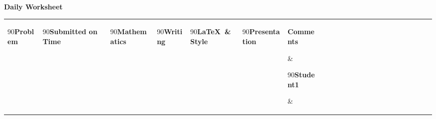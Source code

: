 \documentclass[landscape]{article}
\begin{document}
\thispagestyle{empty}

\begin{center}
    \Large\textbf{Daily Worksheet}
\end{center}

\vspace{0.5cm}

\setlength{\tabcolsep}{4pt}
\renewcommand{\arraystretch}{1.5}

\noindent
\begin{tabular}{|
>{\centering\arraybackslash}m{1.5 cm}|
>{\centering\arraybackslash}m{0.35cm}|
>{\centering\arraybackslash}m{0.35cm}|
>{\centering\arraybackslash}m{0.35cm}|
>{\centering\arraybackslash}m{0.35cm}|
>{\centering\arraybackslash}m{0.35cm}|
>{\arraybackslash}m{9.5cm}|
>{\centering\arraybackslash}m{0.35cm}|%
>{\centering\arraybackslash}m{0.35cm}|%
>{\centering\arraybackslash}m{0.35cm}|%
>{\centering\arraybackslash}m{0.35cm}|%
>{\centering\arraybackslash}m{0.35cm}|%
>{\centering\arraybackslash}m{0.35cm}|%
>{\centering\arraybackslash}m{0.35cm}|%
>{\centering\arraybackslash}m{0.35cm}|%
>{\centering\arraybackslash}m{0.35cm}|%
>{\centering\arraybackslash}m{0.35cm}|%
>{\centering\arraybackslash}m{0.35cm}|%
>{\centering\arraybackslash}m{0.35cm}|%
>{\centering\arraybackslash}m{0.35cm}|%
>{\centering\arraybackslash}m{0.35cm}|%
>{\centering\arraybackslash}m{0.35cm}|%
>{\centering\arraybackslash}m{0.35cm}|%
}
\hline
\multicolumn{7}{|c|}{\textbf{Presenters}} & \multicolumn{16}{c|}{\textbf{Contributors}} \\
\hline
\begin{turn}{90}\textbf{Problem}\end{turn} &
\begin{turn}{90}\textbf{Submitted on Time ~}\end{turn} &
\begin{turn}{90}\textbf{Mathematics}\end{turn} &
\begin{turn}{90}\textbf{Writing}\end{turn} &
\begin{turn}{90}\textbf{\LaTeX\ \& Style}\end{turn} &
\begin{turn}{90}\textbf{Presentation}\end{turn} &
\parbox[c][1.5cm][c]{8cm}{\centering\textbf{Comments}} &
\begin{turn}{90}\textbf{Student1}\end{turn} &

\end{tabular}
\end{document}

